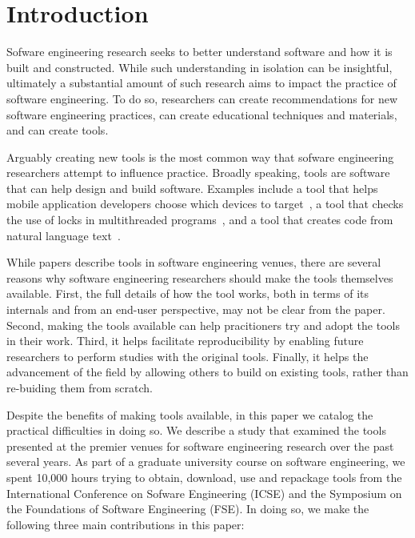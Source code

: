 \documentclass{sig-alternate-05-2015}
\begin{document}
\printccsdesc


\section{Introduction}

Sofware engineering research seeks to better
understand software and how it is built and constructed.
While such understanding in isolation can be insightful,
ultimately a substantial amount of such research 
aims to impact the practice of software engineering.
To do so, researchers can create recommendations
for new software engineering practices, can 
create educational techniques and materials, 
and can create tools.

Arguably creating new tools is the most common
way that sofware engineering researchers
attempt to influence practice.
Broadly speaking, tools are software that can
help design and build software.
Examples include a tool that helps mobile application
developers choose which devices to target~\cite{prada},
a tool that checks the use of locks in multithreaded programs~\cite{ernst},
and a tool that creates code from natural language text~\cite{desai}.

While papers describe tools in software engineering venues,
there are several reasons why software engineering researchers 
should make the tools themselves available.
First, the full details of how the tool works, both in terms of its internals
and from an end-user perspective, may not be clear from the paper.
Second, making the tools available can help pracitioners try and adopt
the tools in their work.
Third, it helps facilitate reproducibility by enabling future researchers
to perform studies with the original tools.
Finally, it helps the advancement of the field by allowing others to build on 
existing tools, rather than re-buiding them from scratch.

Despite the benefits of making tools available, in this paper
we catalog the practical difficulties in doing so.
We describe a study that examined the tools presented at the 
premier venues for software engineering research over the 
past several years.
As part of a graduate university course on software engineering, 
we spent 10,000 hours trying to obtain, download, use
and repackage tools from the International Conference
on Sofware Engineering (ICSE) and the Symposium on the Foundations
of Software Engineering (FSE).
In doing so, we make the following three main 
contributions in this paper:
\end{document}
